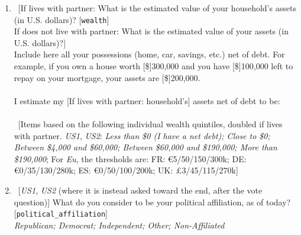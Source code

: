 \begin{enumerate}
\item  ~[If lives with partner: What is the estimated value of your household's assets (in U.S. dollars)? [\verb|wealth|] \\
 If does not live with partner: What is the estimated value of your assets (in U.S. dollars)?]
   \\
Include here all your possessions (home, car, savings, etc.) net of debt. For example, if you own a house worth [\$]300,000 and you have [\$]100,000 left to repay on your mortgage, your assets are [\$]200,000.  \\
  \\
I estimate my [If lives with partner: household's] assets net of debt to be:  \\%
\\ ~[Items based on the following individual wealth quintiles, doubled if lives with partner. \textit{US1}, \textit{US2}: \textit{Less than \$0 (I have a net debt); Close to \$0; Between \$4,000 and \$60,000; Between \$60,000 and \$190,000; More than \$190,000}; For \textit{Eu}, the thresholds are: FR: \euro{}5/50/150/300k; DE: \euro{}0/35/130/280k; ES: \euro{}0/50/100/200k; UK: £3/45/115/270k] 
\item  \label{q:political_affiliation} ~[\textit{US1}, \textit{US2} (where it is instead asked toward the end, after the vote question)] What do you consider to be your political affiliation, as of today? [\verb|political_affiliation|]
\\ \textit{Republican; Democrat; Independent; Other; Non-Affiliated}
\end{enumerate}

